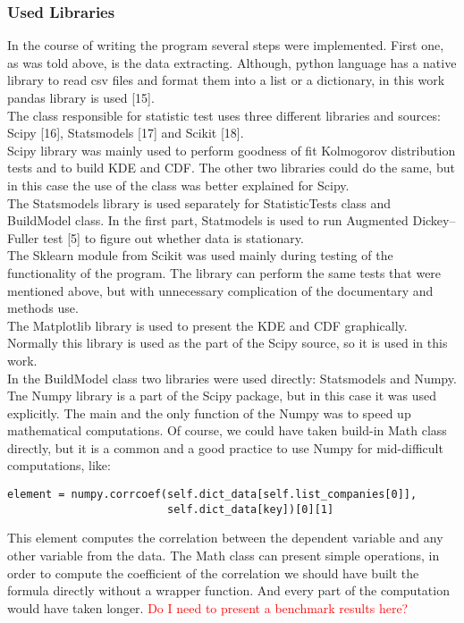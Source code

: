 \documentclass{article}
\begin{document}
\subsubsection{Used Libraries}
In the course of writing the program several steps were implemented. First one, as was told above, is the data extracting. Although, python language has a native library to read csv files and format them into a list or a dictionary, in this work pandas library is used [15]. \\
The class responsible for statistic test uses three different libraries and sources: Scipy [16], Statsmodels [17] and Scikit [18].\\
Scipy library was mainly used to perform goodness of fit Kolmogorov distribution tests and to build KDE and CDF. The other two libraries could do the same, but in this case the use of the class was better explained for Scipy.\\
The Statsmodels library is used separately for StatisticTests class and BuildModel class. In the first part, Statmodels is used to run Augmented Dickey–Fuller test [5] to figure out whether data is stationary.\\
The Sklearn module from Scikit was used mainly during testing of the functionality of the program. The library can perform the same tests that were mentioned above, but with unnecessary complication of the documentary and methods use.\\
The Matplotlib library is used to present the KDE and CDF graphically. Normally this library is used as the part of the Scipy source, so it is used in this work.\\ 
In the BuildModel class two libraries were used directly: Statsmodels and Numpy. Tne Numpy library is a part of the Scipy package, but in this case it was used explicitly. The main and the only function of the Numpy was to speed up mathematical computations. Of course, we could have taken build-in Math class directly, but it is a common and a good practice to use Numpy for mid-difficult computations, like:
\begin{verbatim}
element = numpy.corrcoef(self.dict_data[self.list_companies[0]],
                         self.dict_data[key])[0][1]
\end{verbatim}
This element computes the correlation between the dependent variable and any other variable from the data. The Math class can present simple operations, in order to compute the coefficient of the correlation we should have built the formula directly without a wrapper function. And every part of the computation would have taken longer. \textcolor{red}{Do I need to present a benchmark results here?}\\
\end{document}

